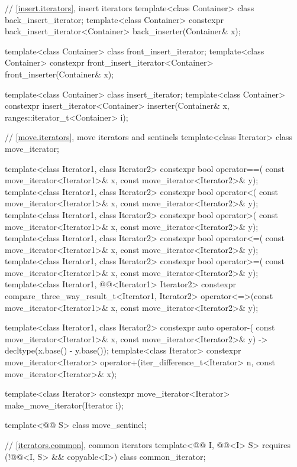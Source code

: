 \begin{codeblock}
{  // \ref{insert.iterators}, insert iterators
  template<class Container> class back_insert_iterator;
  template<class Container>
    constexpr back_insert_iterator<Container> back_inserter(Container& x);

  template<class Container> class front_insert_iterator;
  template<class Container>
    constexpr front_insert_iterator<Container> front_inserter(Container& x);

  template<class Container> class insert_iterator;
  template<class Container>
    constexpr insert_iterator<Container>
      inserter(Container& x, ranges::iterator_t<Container> i);

  // \ref{move.iterators}, move iterators and sentinels
  template<class Iterator> class move_iterator;

  template<class Iterator1, class Iterator2>
    constexpr bool operator==(
      const move_iterator<Iterator1>& x, const move_iterator<Iterator2>& y);
  template<class Iterator1, class Iterator2>
    constexpr bool operator<(
      const move_iterator<Iterator1>& x, const move_iterator<Iterator2>& y);
  template<class Iterator1, class Iterator2>
    constexpr bool operator>(
      const move_iterator<Iterator1>& x, const move_iterator<Iterator2>& y);
  template<class Iterator1, class Iterator2>
    constexpr bool operator<=(
      const move_iterator<Iterator1>& x, const move_iterator<Iterator2>& y);
  template<class Iterator1, class Iterator2>
    constexpr bool operator>=(
      const move_iterator<Iterator1>& x, const move_iterator<Iterator2>& y);
  template<class Iterator1, @@<Iterator1> Iterator2>
    constexpr compare_three_way_result_t<Iterator1, Iterator2>
      operator<=>(const move_iterator<Iterator1>& x,
                  const move_iterator<Iterator2>& y);

  template<class Iterator1, class Iterator2>
    constexpr auto operator-(
    const move_iterator<Iterator1>& x,
    const move_iterator<Iterator2>& y) -> decltype(x.base() - y.base());
  template<class Iterator>
    constexpr move_iterator<Iterator>
      operator+(iter_difference_t<Iterator> n, const move_iterator<Iterator>& x);

  template<class Iterator>
    constexpr move_iterator<Iterator> make_move_iterator(Iterator i);

  template<@@ S> class move_sentinel;

  // \ref{iterators.common}, common iterators
  template<@@ I, @@<I> S>
    requires (!@@<I, S> && copyable<I>)
      class common_iterator;

}
\end{codeblock}
